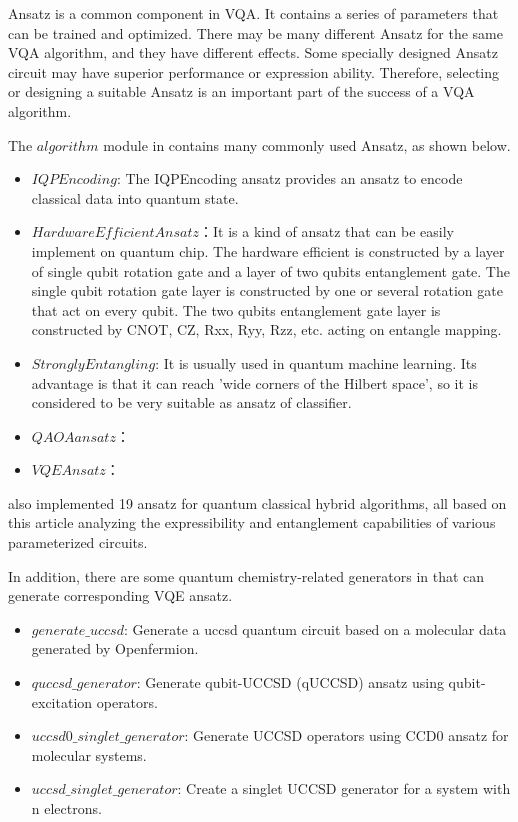 Ansatz is a common component in VQA. It contains a series of parameters that can be trained and optimized. There may be many different Ansatz for the same VQA algorithm, and they have different effects. Some specially designed Ansatz circuit may have superior performance or expression ability. Therefore, selecting or designing a suitable Ansatz is an important part of the success of a VQA algorithm.

The $algorithm$ module in \MindQuantum contains many commonly used Ansatz, as shown below.

\begin{itemize}
    \item $IQPEncoding$: The IQPEncoding ansatz provides an ansatz to encode classical data into quantum state.

    \item $HardwareEfficientAnsatz$：It is a kind of ansatz that can be easily implement on quantum chip. The hardware efficient is constructed by a layer of single qubit rotation gate and a layer of two qubits entanglement gate. The single qubit rotation gate layer is constructed by one or several rotation gate that act on every qubit. The two qubits entanglement gate layer is constructed by CNOT, CZ, Rxx, Ryy, Rzz, etc. acting on entangle mapping.

    \item $StronglyEntangling$: It is usually used in quantum machine learning. Its advantage is that it can reach 'wide
corners of the Hilbert space'\cite{Schuld_2020}, so it is considered to be very suitable as ansatz of classifier.

    \item $QAOA ansatz$：
    \item $VQE Ansatz$：
\end{itemize}

\MindQuantum also implemented 19 ansatz for quantum classical hybrid algorithms, all based on this article analyzing the expressibility and entanglement capabilities of various parameterized circuits.\cite{Sim_2019}

In addition, there are some quantum chemistry-related generators in \MindQuantum that can generate corresponding VQE ansatz.

\begin{itemize}
    \item $generate\_uccsd$: Generate a uccsd quantum circuit based on a molecular data generated by Openfermion.
    \item $quccsd\_generator$: Generate qubit-UCCSD (qUCCSD) ansatz using qubit-excitation operators.
    \item $uccsd0\_singlet\_generator$: Generate UCCSD operators using CCD0 ansatz for molecular systems.
    \item $uccsd\_singlet\_generator$: Create a singlet UCCSD generator for a system with n electrons.
\end{itemize}


